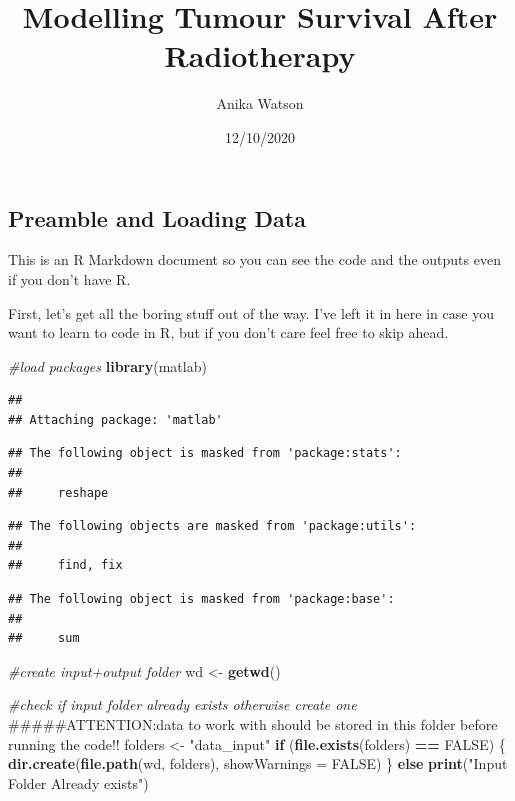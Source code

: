 \documentclass[]{article}
\title{Modelling Tumour Survival After Radiotherapy}
\author{Anika Watson}
\date{12/10/2020}
\newenvironment{Shaded}{\begin{snugshade}}{\end{snugshade}}
\newcommand{\KeywordTok}[1]{\textcolor[rgb]{0.13,0.29,0.53}{\textbf{#1}}}
\newcommand{\DataTypeTok}[1]{\textcolor[rgb]{0.13,0.29,0.53}{#1}}
\newcommand{\StringTok}[1]{\textcolor[rgb]{0.31,0.60,0.02}{#1}}
\newcommand{\CommentTok}[1]{\textcolor[rgb]{0.56,0.35,0.01}{\textit{#1}}}
\newcommand{\OtherTok}[1]{\textcolor[rgb]{0.56,0.35,0.01}{#1}}
\newcommand{\ControlFlowTok}[1]{\textcolor[rgb]{0.13,0.29,0.53}{\textbf{#1}}}
\newcommand{\OperatorTok}[1]{\textcolor[rgb]{0.81,0.36,0.00}{\textbf{#1}}}
\newcommand{\NormalTok}[1]{#1}
\begin{document}
\maketitle

\subsection{Preamble and Loading Data}\label{preamble-and-loading-data}

This is an R Markdown document so you can see the code and the outputs
even if you don't have R.

First, let's get all the boring stuff out of the way. I've left it in
here in case you want to learn to code in R, but if you don't care feel
free to skip ahead.

\begin{Shaded}
\begin{Highlighting}[]
\CommentTok{#load packages}
\KeywordTok{library}\NormalTok{(matlab)}
\end{Highlighting}
\end{Shaded}

\begin{verbatim}
## 
## Attaching package: 'matlab'
\end{verbatim}

\begin{verbatim}
## The following object is masked from 'package:stats':
## 
##     reshape
\end{verbatim}

\begin{verbatim}
## The following objects are masked from 'package:utils':
## 
##     find, fix
\end{verbatim}

\begin{verbatim}
## The following object is masked from 'package:base':
## 
##     sum
\end{verbatim}

\begin{Shaded}
\begin{Highlighting}[]
\CommentTok{#create input+output folder }
\NormalTok{wd <-}\StringTok{ }\KeywordTok{getwd}\NormalTok{()}

\CommentTok{#check if input folder already exists otherwise create one}
\NormalTok{#####ATTENTION:data to work with should be stored in this folder before running the code!!}
\NormalTok{folders <-}\StringTok{ "data_input"}
\ControlFlowTok{if}\NormalTok{ (}\KeywordTok{file.exists}\NormalTok{(folders) }\OperatorTok{==}\StringTok{ }\OtherTok{FALSE}\NormalTok{) \{}
  \KeywordTok{dir.create}\NormalTok{(}\KeywordTok{file.path}\NormalTok{(wd, folders), }\DataTypeTok{showWarnings =} \OtherTok{FALSE}\NormalTok{) }
\NormalTok{\} }\ControlFlowTok{else} \KeywordTok{print}\NormalTok{(}\StringTok{"Input Folder Already exists"}\NormalTok{)}
\end{Highlighting}
\end{Shaded}
\end{document}
